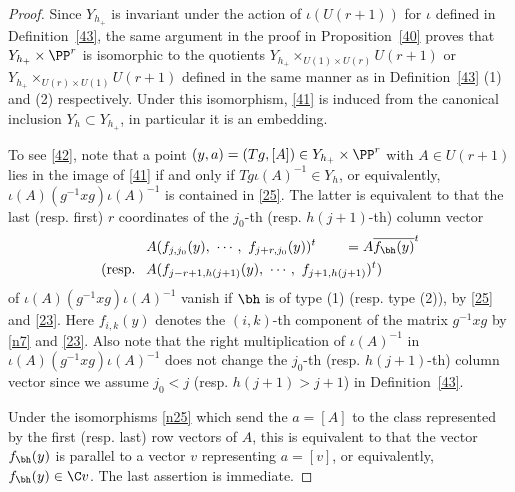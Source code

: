 \begin{proof}
	Since $Y_{h_+}$ is invariant under the action of $\iota(U(r+1))$ for $\iota$ defined in Definition~\ref{43}, 
	the same argument in the proof in Proposition~\ref{40} proves that $Y_{h_+}\times \PP^r$ is isomorphic to the quotients $Y_{h_+}\times_{U(1)\times U(r)}U(r+1)$ or $Y_{h_+}\times_{U(r)\times U(1)}U(r+1)$ defined in the same manner as in Definition~\ref{43} (1) and (2) respectively.
 	Under this isomorphism, \eqref{41} is induced from the canonical inclusion $Y_h\subset Y_{h_+}$, in particular it is an embedding. 
 	
 	To see \eqref{42}, note that a point $(y,a)=(Tg,[A])\in Y_{h_+}\times \PP^r$ with $A\in U(r+1)$ lies in the image of \eqref{41} if and only if $Tg\iota(A)^{-1}\in Y_h$, or equivalently, $\iota(A)(g^{-1}x g)\iota(A)^{-1}$ is contained in \eqref{25}. 
  	The latter is equivalent to that the last (resp. first) $r$ coordinates of the 
  	$j_0$-th (resp. $h(j+1)$-th)
  	column vector
 	\begin{equation}\label{52}
 		\begin{split}
 			&A (f_{j,j_0}(y),~\cdots,~f_{j+r,j_0}(y))^t\qquad =A \overline{f_\bh(y)}^t\\
 			(\text{resp. } ~&A (f_{j-r+1,h(j+1)}(y),~\cdots,~ f_{j+1,h(j+1)} )^t)
 		\end{split}
 	\end{equation}
 	of $\iota(A)(g^{-1}x g)\iota(A)^{-1}$ vanish if $\bh$ is of type (1) (resp. type (2)), by \eqref{25} and \eqref{23}. 
 	Here $f_{i,k}(y)$ denotes the $(i,k)$-th component of the matrix $g^{-1}xg$ by \eqref{n7} and \eqref{23}. Also note that the right multiplication of $\iota(A)^{-1}$ in $\iota(A)(g^{-1}x g)\iota(A)^{-1}$ does not change the $j_0$-th (resp. $h(j+1)$-th) column vector since we assume $j_0<j$ (resp. $h(j+1)>j+1$) in Definition~\ref{43}.

 	
 	Under the isomorphisms \eqref{n25} which send the $a=[A]$ to the class represented by the first (resp. last) row vectors of $A$, this is equivalent to that the vector $f_\bh(y)$ is parallel to a vector $v$ representing $a=[v]$, or equivalently, $f_\bh(y)\in \C v$. 
 	The last assertion is immediate.
\end{proof}

